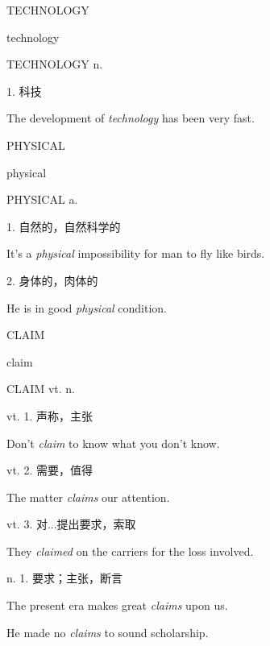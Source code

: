 \begin{flashcard}{
TECHNOLOGY

technology
}
\begin{center}
TECHNOLOGY n. 
\end{center}
1. 科技

The development of \textit{technology} has been very fast.

\end{flashcard}
\begin{flashcard}{
PHYSICAL

physical
}
\begin{center}
PHYSICAL a. 
\end{center}
1. 自然的，自然科学的

It's a \textit{physical} impossibility for man to fly like birds.

2. 身体的，肉体的

He is in good \textit{physical} condition.

\end{flashcard}
\begin{flashcard}{
CLAIM

claim
}
\begin{center}
CLAIM vt. n. \textipa{[kleim]}
\end{center}
vt. 1. 声称，主张

Don't \textit{claim} to know what you don't know.

vt. 2. 需要，值得

The matter \textit{claims} our attention.

vt. 3. 对...提出要求，索取

They \textit{claimed} on the carriers for the loss involved.

n. 1. 要求；主张，断言

The present era makes great \textit{claims} upon us.

He made no \textit{claims} to sound scholarship.

\end{flashcard}
